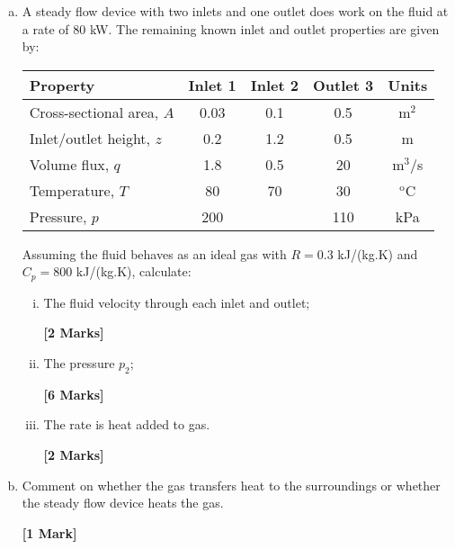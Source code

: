 \documentclass[calculator,refrigeranttables,datasheet,resit]{exam}
\begin{document}
\begin{question}
\begin{enumerate}[(a)]
\item  A steady flow device with two inlets and one outlet does work on the fluid at a rate of 80 kW. The remaining known inlet and outlet properties are given by: \\
\begin{center}
\begin{tabular}{||l |c |c |c |c ||}
\hline\hline
{\bf Property}            & {\bf Inlet 1} & {\bf Inlet 2} & {\bf Outlet 3} & {\bf Units} \\
\hline\hline
Cross-sectional area, $A$ & 0.03          & 0.1           & 0.5            & m$^{2}$ \\
Inlet/outlet height, $z$  & 0.2           & 1.2           & 0.5            & m    \\
Volume flux, $q$          & 1.8           & 0.5           & 20             & m$^{3}$/s \\
Temperature, $T$          & 80            & 70            & 30             & $^{\text{o}}$C\\
Pressure, $p$             & 200           &               & 110            & kPa\\
\hline \hline
\end{tabular}
\end{center}
Assuming the fluid behaves as an ideal gas with  $R=0.3$ kJ/(kg.K) and $C_{p}=800$ kJ/(kg.K), calculate:
\begin{enumerate}[(i)]
\item The fluid velocity through each inlet and outlet; 
\begin{flushright}
{\bf [2 Marks]}
\end{flushright} 
\item The pressure $p_{2}$;
\begin{flushright}
{\bf [6 Marks]}
\end{flushright} 
\item The rate is heat added to gas.
\begin{flushright}
{\bf [2 Marks]}
\end{flushright} 
\end{enumerate}
\medskip

\item Comment on whether the gas transfers heat to the surroundings or whether the steady flow device heats the gas.
\begin{flushright}
{\bf [1 Mark]}
\end{flushright} 
\end{enumerate} 

\end{question}
\end{document}
